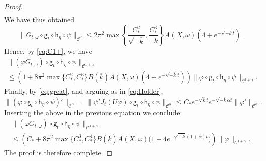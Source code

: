 \documentclass[10pt,a4paper]{amsart}
\newcommand \cC {{\mathscr{C}}}
\newcommand{\geo}{\mathsf{g}}
\newcommand{\horo}{\mathsf{h}}
\begin{document}
\begin{proof}
\[\begin{split}
\end{split}
\]
We have thus obtained
\[
\|G_{t,\omega}\circ  \geo_t\circ \horo_\eta \circ \psi\|_{\cC^2}\le 2\pi^2\max\left\{\frac{C_*^2}{\sqrt{-\overline k}}, \frac{ C_*^3}{-\overline k}\right\}A(X,\omega)\left(4+e^{-\sqrt{-\overline k}t}\right).
\]
Hence, by \eqref{eq:C1+}, we have
\begin{multline*}
\|(\varphi G_{t,\omega})\circ \geo_t\circ \horo_\eta\circ \psi \|_{\cC^{1+\alpha}} \\ \le (1+8\pi^2\max\{C_*^2,C_*^3\}B(\overline k)A(X,\omega)(4+e^{-\sqrt{-\overline k}t}))\|\varphi\circ \geo_t\circ \horo_\eta\circ \psi \|_{\cC^{1+\alpha}}.
\end{multline*}
Finally, by \eqref{eq:great}, and arguing as in \eqref{eq:Holder},
\[
\|(\varphi\circ \geo_t\circ \horo_\eta\circ \psi)'\|_{\cC^{\alpha}}=\| \psi' J_t (U\varphi)\circ \geo_t\circ \horo_\eta \circ \psi\|_{\cC^\alpha}\le C_*e^{-\sqrt{\overline k}t}e^{-\sqrt{-\overline k} \alpha t}\|\varphi'\|_{\cC^\alpha}.
\]
Inserting the above in the previous equation we conclude:
\begin{multline*}
\|(\varphi G_{t,\omega})\circ \geo_t\circ \horo_\eta\circ \psi \|_{\cC^{1+\alpha}} \\ \le  \left(C_*+8\pi^2\max\{C_*^3,C_*^4\} B(\overline k)A(X,\omega)\big(1+4e^{-\sqrt{-\overline k}(1+\alpha)t}\big)\right)\|\varphi\|_{\cC^{1+\alpha}}.
\end{multline*}
The proof is therefore complete.
\end{proof}
\end{document}
